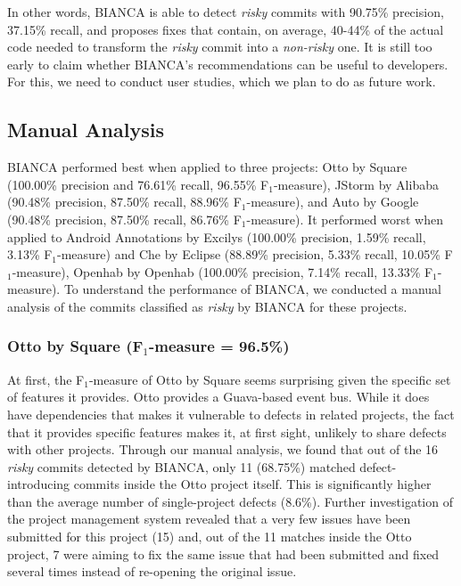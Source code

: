 \documentclass[conference]{IEEEtran}
\begin{document}
In other words, BIANCA is able to detect \emph{risky} commits with
90.75\% precision, 37.15\% recall, and proposes fixes that contain, on
average, 40-44\% of the actual code needed to transform the \emph{risky}
commit into a \emph{non-risky} one. It is still too early to claim
whether BIANCA's recommendations can be useful to developers. For this,
we need to conduct user studies, which we plan to do as future work.

\subsection{Manual Analysis}\label{manual-analysis}

BIANCA performed best when applied to three projects: Otto by Square
(100.00\% precision and 76.61\% recall, 96.55\% F$_1$-measure), JStorm
by Alibaba (90.48\% precision, 87.50\% recall, 88.96\% F$_1$-measure),
and Auto by Google (90.48\% precision, 87.50\% recall, 86.76\%
F$_1$-measure). It performed worst when applied to Android Annotations
by Excilys (100.00\% precision, 1.59\% recall, 3.13\% F$_1$-measure) and
Che by Eclipse (88.89\% precision, 5.33\% recall, 10.05\%
F$_1$-measure), Openhab by Openhab (100.00\% precision, 7.14\% recall,
13.33\% F$_1$-measure). To understand the performance of BIANCA, we
conducted a manual analysis of the commits classified as \emph{risky} by
BIANCA for these projects.

\subsubsection{Otto by Square (F$_1$-measure =
96.5\%)}\label{otto-by-square-fux5f1-measure-96.5}

At first, the F$_1$-measure of Otto by Square seems surprising given the
specific set of features it provides. Otto provides a Guava-based event
bus. While it does have dependencies that makes it vulnerable to defects
in related projects, the fact that it provides specific features makes
it, at first sight, unlikely to share defects with other projects.
Through our manual analysis, we found that out of the 16 \emph{risky}
commits detected by BIANCA, only 11 (68.75\%) matched defect-introducing
commits inside the Otto project itself. This is significantly higher
than the average number of single-project defects (8.6\%). Further
investigation of the project management system revealed that a very few
issues have been submitted for this project (15) and, out of the 11
matches inside the Otto project, 7 were aiming to fix the same issue
that had been submitted and fixed several times instead of re-opening
the original issue.
\end{document}
